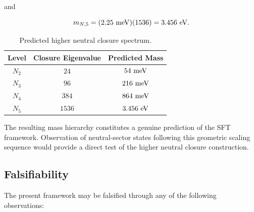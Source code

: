 \documentclass[11pt]{article}
\theoremstyle{definition}
\theoremstyle{remark}
\begin{document}
and

\begin{equation}
m_{N,5}
=
(2.25~{\rm meV})(1536)
=
3.456~{\rm eV}.
\end{equation}

\begin{table}[H]
\centering
\caption{Predicted higher neutral closure spectrum.}
\begin{tabular}{ccc}
\toprule
Level &
Closure Eigenvalue &
Predicted Mass \\
\midrule
$N_2$ & $24$ & $54~{\rm meV}$ \\
$N_3$ & $96$ & $216~{\rm meV}$ \\
$N_4$ & $384$ & $864~{\rm meV}$ \\
$N_5$ & $1536$ & $3.456~{\rm eV}$ \\
\bottomrule
\end{tabular}
\end{table}

The resulting mass hierarchy constitutes a genuine prediction of
the SFT framework. Observation of neutral-sector states
following this geometric scaling sequence would provide a direct
test of the higher neutral closure construction.

\subsection{Falsifiability}

The present framework may be falsified through any of the
following observations:
\end{document}
